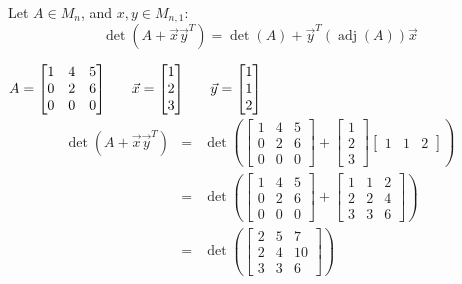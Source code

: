 \documentclass[letterpaper,12pt,fleqn]{article}
\DeclareMathOperator{\adj}{adj}
\newcommand{\vx}{\vec{x}}
\newcommand{\vy}{\vec{y}}
\begin{document}
\begin{theorem}
  Let $A\in M_n$, and $x,y\in M_{n,1}$:
  \[\det(A+\vx\vy^T)=\det(A)+\vy^T(\adj(A))\vx\]
\end{theorem}

\begin{example}
  $A=\begin{bmatrix}
  1 & 4 & 5 \\
  0 & 2 & 6 \\
  0 & 0 & 0
  \end{bmatrix}
  \hspace{4ex}
  \vx=\begin{bmatrix} 1 \\ 2 \\ 3 \end{bmatrix}
  \hspace{4ex}
  \vy=\begin{bmatrix} 1 \\ 1 \\ 2 \end{bmatrix}$
  \begin{eqnarray*}
    \det(A+\vx\vy^T) &=& \det\left(\begin{bmatrix}
    1 & 4 & 5 \\
    0 & 2 & 6 \\
    0 & 0 & 0
    \end{bmatrix}+
    \begin{bmatrix} 1 \\ 2 \\ 3 \end{bmatrix}\begin{bmatrix} 1 & 1 & 2 \end{bmatrix}
    \right) \\
    &=& \det\left(\begin{bmatrix}
    1 & 4 & 5 \\
    0 & 2 & 6 \\
    0 & 0 & 0
    \end{bmatrix}+\begin{bmatrix}
    1 & 1 & 2 \\
    2 & 2 & 4 \\
    3 & 3 & 6
    \end{bmatrix}\right) \\
    &=& \det\left(\begin{bmatrix}
      2 & 5 & 7 \\
      2 & 4 & 10 \\
      3 & 3 & 6
    \end{bmatrix}\right) \\

\end{eqnarray*}
\end{example}
\end{document}
